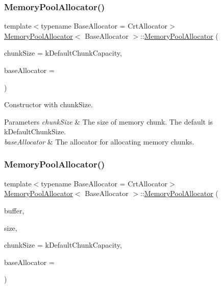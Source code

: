\subsubsection{\texorpdfstring{Memory\+Pool\+Allocator()}{MemoryPoolAllocator()}\hspace{0.1cm}{\footnotesize\ttfamily [3/4]}}
{\footnotesize\ttfamily template$<$typename Base\+Allocator = Crt\+Allocator$>$ \\
\hyperlink{classMemoryPoolAllocator}{Memory\+Pool\+Allocator}$<$ Base\+Allocator $>$\+::\hyperlink{classMemoryPoolAllocator}{Memory\+Pool\+Allocator} (\begin{DoxyParamCaption}\item[{size\+\_\+t}]{chunk\+Size = {\ttfamily kDefaultChunkCapacity},  }\item[{Base\+Allocator $\ast$}]{base\+Allocator = {} }\end{DoxyParamCaption})\hspace{0.3cm}{\ttfamily [inline]}}



Constructor with chunk\+Size. 


\begin{DoxyParams}{Parameters}
{\em chunk\+Size} & The size of memory chunk. The default is k\+Default\+Chunk\+Size. \\
\hline
{\em base\+Allocator} & The allocator for allocating memory chunks. \\
\hline
\end{DoxyParams}
\mbox{\label{classMemoryPoolAllocator_a1f0d865093fdb955d956b7a445a8ddbf}} 
\subsubsection{\texorpdfstring{Memory\+Pool\+Allocator()}{MemoryPoolAllocator()}\hspace{0.1cm}{\footnotesize\ttfamily [4/4]}}
{\footnotesize\ttfamily template$<$typename Base\+Allocator = Crt\+Allocator$>$ \\
\hyperlink{classMemoryPoolAllocator}{Memory\+Pool\+Allocator}$<$ Base\+Allocator $>$\+::\hyperlink{classMemoryPoolAllocator}{Memory\+Pool\+Allocator} (\begin{DoxyParamCaption}\item[{void $\ast$}]{buffer,  }\item[{size\+\_\+t}]{size,  }\item[{size\+\_\+t}]{chunk\+Size = {\ttfamily kDefaultChunkCapacity},  }\item[{Base\+Allocator $\ast$}]{base\+Allocator = {} }\end{DoxyParamCaption})\hspace{0.3cm}{\ttfamily [inline]}}



